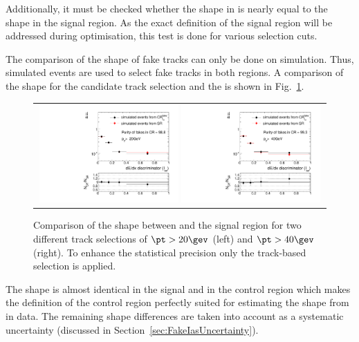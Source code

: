 Additionally, it must be checked whether the \ias shape in \fakeCR is nearly equal to the \ias shape in the signal region.
As the exact definition of the signal region will be addressed during optimisation, this test is done for various \pt selection cuts.

The comparison of the \ias shape of fake tracks can only be done on simulation.
Thus, simulated \WJets events are used to select fake tracks in both regions.
A comparison of the shape for the candidate track selection and the \fakeCR is shown in Fig.~\ref{fig:IasSRCRFakes}.

\begin{figure}[!t]
  \centering 
  \begin{tabular}{c}
    \includegraphics[width=0.49\textwidth]{figures/analysis/Background/hASmi_fakes_ECalaoLe5_trackPtGt20.pdf}
    \includegraphics[width=0.49\textwidth]{figures/analysis/Background/hASmi_fakes_ECalaoLe5_trackPtGt40.pdf}
  \end{tabular}
  \caption{Comparison of the \ias shape between \fakeCR and the signal region for two different track \pt selections of $\pt>20\gev$ (left) and $\pt>40\gev$ (right). To enhance the statistical precision only the track-based selection is applied.}
  \label{fig:IasSRCRFakes}
\end{figure}

The \ias shape is almost identical in the signal and in the control region which makes the definition of the control region perfectly suited for estimating the \ias shape from \fakeCR in data.
The remaining shape differences are taken into account as a systematic uncertainty (discussed in Section~\ref{sec:FakeIasUncertainty}).
\FloatBarrier
